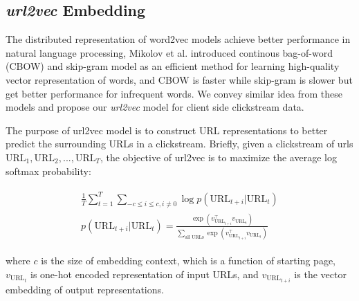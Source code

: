 

\subsection{\emph{url2vec} Embedding}

The distributed representation of word2vec models achieve better performance 
in natural language processing,
Mikolov et al. \cite{DBLP:journals/corr/abs-1301-3781} introduced 
continous bag-of-word (CBOW) and skip-gram model as an efficient method for learning high-quality
vector representation of words, and CBOW is faster while skip-gram is slower but get better
performance for infrequent words. We convey similar idea from these models and propose our
\emph{url2vec} model for client side clickstream data.

The purpose of url2vec model is to construct URL representations to better predict 
the surrounding URLs in a clickstream. Briefly, given a clickstream of urls 
$\text{URL}_1, \text{URL}_2, ..., \text{URL}_T$, the objective of url2vec is to maximize the average
log softmax probability:

\begin{align}
\label{eqn:url2vecprob}
\begin{split}
    \frac{1}{T}\sum^{T}_{t=1}\sum_{-c \leq i \leq c, i \neq 0} {\log{p(\text{URL}_{t+i} | \text{URL}_t)}}\\
    p(\text{URL}_{t+i} | \text{URL}_t) = \frac{
        \exp{(v_{\text{URL}_{t+i}} ^\top v_{\text{URL}_t})}
    }{
        \sum_{\text{all URLs}} {\exp{(v_{\text{URL}_{t+i}} ^\top v_{\text{URL}_t})}}
    }
\end{split}
\end{align}

where $c$ is the size of embedding context, which is a function of starting page,
$v_{\text{URL}_t}$ is one-hot encoded representation of input URLs, and 
$v_{\text{URL}_{t+i}}$ is the vector embedding of output representations.

